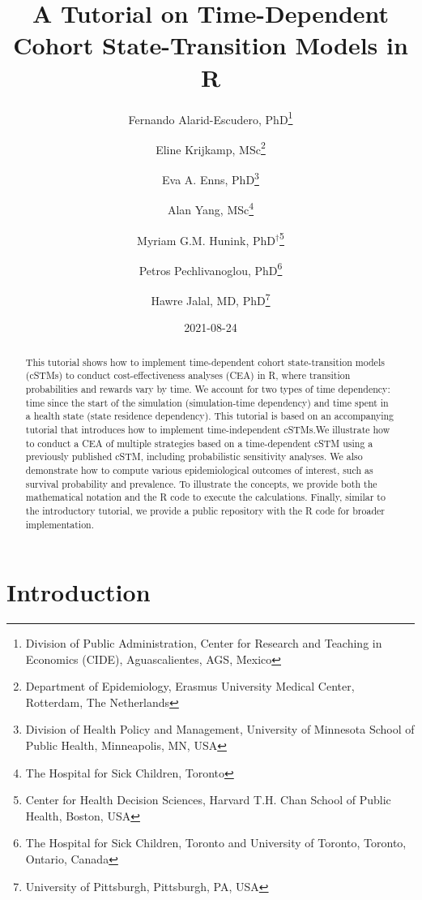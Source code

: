 \documentclass[
]{article}
\title{A Tutorial on Time-Dependent Cohort State-Transition Models in R}
\author{Fernando Alarid-Escudero, PhD\footnote{Division of Public Administration, Center for Research and Teaching in Economics (CIDE), Aguascalientes, AGS, Mexico} \and Eline Krijkamp, MSc\footnote{Department of Epidemiology, Erasmus University Medical Center, Rotterdam, The Netherlands} \and Eva A. Enns, PhD\footnote{Division of Health Policy and Management, University of Minnesota School of Public Health, Minneapolis, MN, USA} \and Alan Yang, MSc\footnote{The Hospital for Sick Children, Toronto} \and Myriam G.M. Hunink, PhD\(^\dagger\)\footnote{Center for Health Decision Sciences, Harvard T.H. Chan School of Public Health, Boston, USA} \and Petros Pechlivanoglou, PhD\footnote{The Hospital for Sick Children, Toronto and University of Toronto, Toronto, Ontario, Canada} \and Hawre Jalal, MD, PhD\footnote{University of Pittsburgh, Pittsburgh, PA, USA}}
\date{2021-08-24}
\begin{document}
\maketitle
\begin{abstract}
This tutorial shows how to implement time-dependent cohort state-transition models (cSTMs) to conduct cost-effectiveness analyses (CEA) in R, where transition probabilities and rewards vary by time. We account for two types of time dependency: time since the start of the simulation (simulation-time dependency) and time spent in a health state (state residence dependency). This tutorial is based on an accompanying tutorial that introduces how to implement time-independent cSTMs.We illustrate how to conduct a CEA of multiple strategies based on a time-dependent cSTM using a previously published cSTM, including probabilistic sensitivity analyses. We also demonstrate how to compute various epidemiological outcomes of interest, such as survival probability and prevalence. To illustrate the concepts, we provide both the mathematical notation and the R code to execute the calculations. Finally, similar to the introductory tutorial, we provide a public repository with the R code for broader implementation.
\end{abstract}

{
\setcounter{tocdepth}{2}
\tableofcontents
}
\hypertarget{introduction}{%
\section{Introduction}\label{introduction}}
\end{document}
